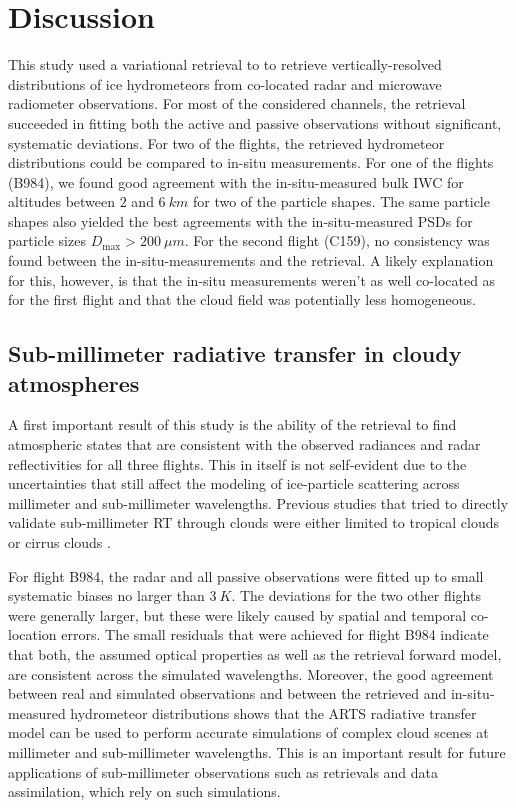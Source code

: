 \documentclass[journal abbreviation, manuscript]{copernicus}
\begin{document}
\section{Discussion}
\label{sec:discussion}

This study used a variational retrieval to to retrieve vertically-resolved
distributions of ice hydrometeors from co-located radar and microwave radiometer
observations. For most of the considered channels, the retrieval succeeded in
fitting both the active and passive observations without significant, systematic
deviations. For two of the flights, the retrieved hydrometeor distributions
could be compared to in-situ measurements. For one of the flights (B984), we
found good agreement with the in-situ-measured bulk IWC for altitudes between
$2$ and $6\ \unit{km}$ for two of the particle shapes. The same particle shapes
also yielded the best agreements with the in-situ-measured PSDs for particle
sizes $D_\text{max} > 200\ \unit{\mu m}$. For the second flight (C159), no
consistency was found between the in-situ-measurements and the retrieval. A
likely explanation for this, however, is that the in-situ measurements weren't
as well co-located as for the first flight and that the cloud field was
potentially less homogeneous.

\subsection{Sub-millimeter radiative transfer in cloudy atmospheres}

 A first important result of this study is the ability of the retrieval to find
 atmospheric states that are consistent with the observed radiances and radar
 reflectivities for all three flights. This in itself is not self-evident due to
 the uncertainties that still affect the modeling of ice-particle scattering
 across millimeter and sub-millimeter wavelengths. Previous studies that tried
 to directly validate sub-millimeter RT through clouds were either limited to
 tropical clouds \citep{evans05, eriksson07} or cirrus clouds \citep{fox17}.

 For flight B984, the radar and all passive observations were fitted up to small
 systematic biases no larger than $3\ \unit{K}$. The deviations for the two
 other flights were generally larger, but these were likely caused by spatial
 and temporal co-location errors. The small residuals that were achieved for
 flight B984 indicate that both, the assumed optical properties as well as the
 retrieval forward model, are consistent across the simulated wavelengths.
 Moreover, the good agreement between real and simulated observations and
 between the retrieved and in-situ-measured hydrometeor distributions shows that
 the ARTS radiative transfer model can be used to perform accurate simulations
 of complex cloud scenes at millimeter and sub-millimeter wavelengths. This is
 an important result for future applications of sub-millimeter observations such
 as retrievals and data assimilation, which rely on such simulations.
\end{document}
